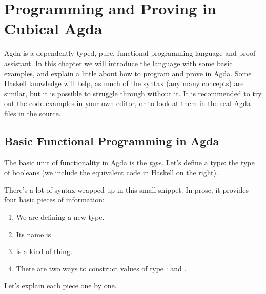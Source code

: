 \chapter{Programming and Proving in Cubical Agda} \label{agda-intro}
Agda \citep{norellDependentlyTypedProgramming2008} is a dependently-typed, pure,
functional programming language and proof assistant.
In this chapter we will introduce the language with some basic examples, and
explain a little about how to program and prove in Agda.
Some Haskell knowledge will help, as much of the syntax (any many concepts) are
similar, but it is possible to struggle through without it.
It is recommended to try out the code examples in your own editor, or to look at
them in the real Agda files in the source.

\section{Basic Functional Programming in Agda}
The basic unit of functionality in Agda is the \emph{type}.
Let's define a type: the type of booleans (we include the equivalent code in
Haskell on the right).
\begin{agdalisting} \label{bool-def}
  \begin{multicols}{2} \centering
     \columnbreak
  \end{multicols}\vspace{-2\baselineskip}
\end{agdalisting}
There's a lot of syntax wrapped up in this small snippet.
In prose, it provides four basic pieces of information:
\begin{samepage}
\begin{enumerate}
  \item We are defining a new  type.
  \item Its name is .
  \item {} is a  kind of thing.
  \item There are two ways to construct values of type :
     and .
\end{enumerate}
\end{samepage}
Let's explain each piece one by one. 

